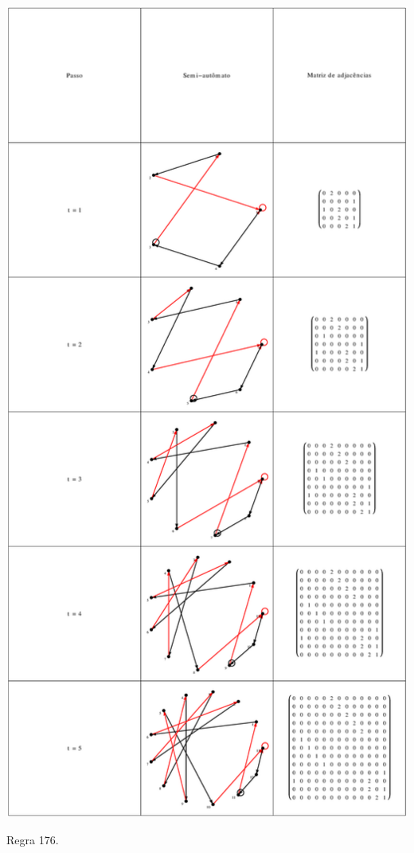 \documentclass[12pt,a4paper]{article}
\begin{document}
\begin{table}[H]
\begin{center}
\includegraphics[scale=0.32]{img/mat/matr176.eps}
\caption{Regra 176.}
\label{tab:mr176}
\end{center}
\end{table}
\end{document}
